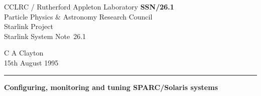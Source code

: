\documentclass[11pt]{article}
\newcommand{\stardoccategory}  {Starlink System Note}
\newcommand{\stardocinitials}  {SSN}
\newcommand{\stardocnumber}    {26.1}
\newcommand{\stardocauthors}   {C A Clayton}
\newcommand{\stardocdate}      {15th August 1995}
\newcommand{\stardoctitle}     {Configuring, monitoring and tuning SPARC/Solaris systems}
\newcommand{\stardocname}{\stardocinitials /\stardocnumber}
\newenvironment{latexonly}{}{}
\begin{document}
\thispagestyle{empty}

\begin{latexonly}
   CCLRC / {\sc Rutherford Appleton Laboratory} \hfill {\bf \stardocname}\\
   {\large Particle Physics \& Astronomy Research Council}\\
   {\large Starlink Project\\}
   {\large \stardoccategory\ \stardocnumber}
   \begin{flushright}
   \stardocauthors\\
   \stardocdate
   \end{flushright}
   \vspace{-4mm}
   \rule{\textwidth}{0.5mm}
   \vspace{5mm}
   \begin{center}
   {\Large\bf \stardoctitle}
   \end{center}
   \vspace{5mm}

\end{latexonly}
\end{document}
